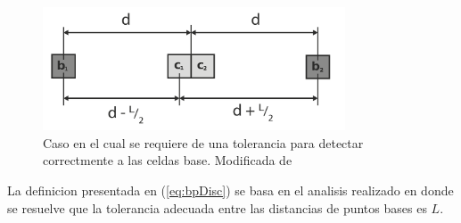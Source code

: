 \begin{figure}[H]
  \centerfloat

  \includegraphics[clip=true, width=0.80\textwidth]{imagenes/basis/horizontalMod.png}

  \caption[Caso en el cual se requiere de una tolerancia para detectar correctmente a las celdas base.]{Caso en el cual se requiere de una tolerancia para detectar correctmente a las celdas base. Modificada de \cite{Liu2015}}\label{fig:bptol}

\end{figure}

La definicion presentada en (\ref{eq:bpDisc}) se basa en el analisis realizado
en \cite{Liu2015} donde se resuelve que la tolerancia adecuada entre las
distancias de puntos bases es $L$.



